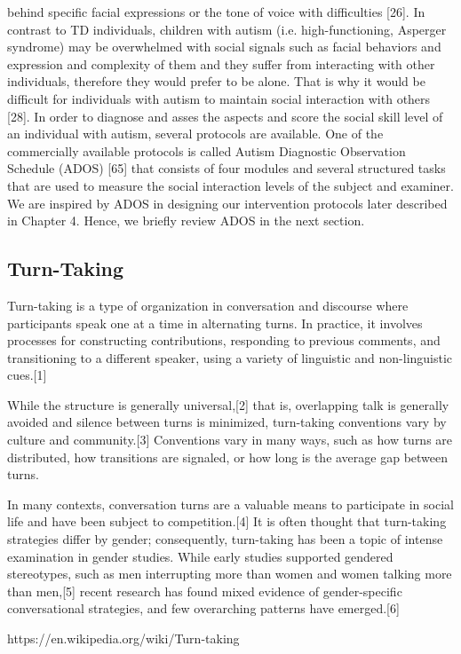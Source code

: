 behind specific facial expressions or the tone of voice with difficulties [26]. In contrast to
TD individuals, children with autism (i.e. high-functioning, Asperger syndrome) may be
overwhelmed with social signals such as facial behaviors and expression and complexity
of them and they suffer from interacting with other individuals, therefore they would prefer
to be alone. That is why it would be difficult for individuals with autism to maintain social
interaction with others [28].
In order to diagnose and asses the aspects and score the social skill level of an individual
with autism, several protocols are available. One of the commercially available protocols
is called Autism Diagnostic Observation Schedule (ADOS) [65] that consists of four
modules and several structured tasks that are used to measure the social interaction levels
of the subject and examiner. We are inspired by ADOS in designing our intervention
protocols later described in Chapter 4. Hence, we briefly review ADOS in the next section.

\subsection{Turn-Taking}
Turn-taking is a type of organization in conversation and discourse where participants speak one at a time in alternating turns. In practice, it involves processes for constructing contributions, responding to previous comments, and transitioning to a different speaker, using a variety of linguistic and non-linguistic cues.[1]

While the structure is generally universal,[2] that is, overlapping talk is generally avoided and silence between turns is minimized, turn-taking conventions vary by culture and community.[3] Conventions vary in many ways, such as how turns are distributed, how transitions are signaled, or how long is the average gap between turns.

In many contexts, conversation turns are a valuable means to participate in social life and have been subject to competition.[4] It is often thought that turn-taking strategies differ by gender; consequently, turn-taking has been a topic of intense examination in gender studies. While early studies supported gendered stereotypes, such as men interrupting more than women and women talking more than men,[5] recent research has found mixed evidence of gender-specific conversational strategies, and few overarching patterns have emerged.[6]

https://en.wikipedia.org/wiki/Turn-taking

